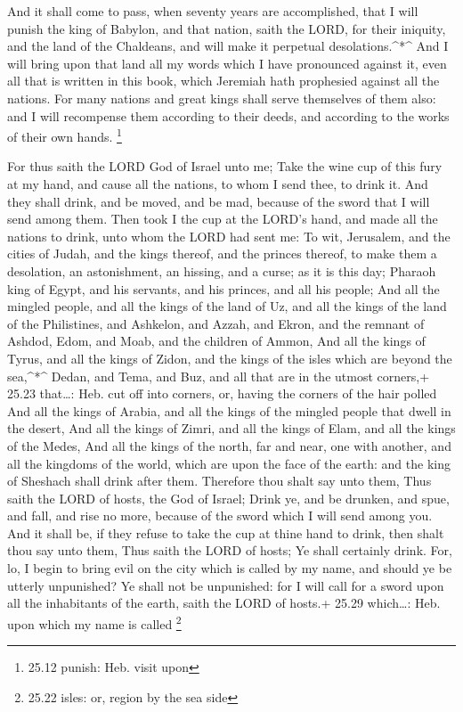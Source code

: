  And it shall come to pass, when seventy years are
accomplished, that I will punish the king of Babylon, and that nation,
saith the LORD, for their iniquity, and the land of the Chaldeans, and
will make it perpetual desolations.\^{}*\^{}  And I will
bring upon that land all my words which I have pronounced against it,
even all that is written in this book, which Jeremiah hath prophesied
against all the nations.  For many nations and great kings
shall serve themselves of them also: and I will recompense them
according to their deeds, and according to the works of their own hands.
\footnote{25.12 punish: Heb. visit upon}

 For thus saith the LORD God of Israel unto me; Take the
wine cup of this fury at my hand, and cause all the nations, to whom I
send thee, to drink it.  And they shall drink, and be
moved, and be mad, because of the sword that I will send among them.
 Then took I the cup at the LORD's hand, and made all the
nations to drink, unto whom the LORD had sent me:  To wit,
Jerusalem, and the cities of Judah, and the kings thereof, and the
princes thereof, to make them a desolation, an astonishment, an hissing,
and a curse; as it is this day;  Pharaoh king of Egypt, and
his servants, and his princes, and all his people;  And all
the mingled people, and all the kings of the land of Uz, and all the
kings of the land of the Philistines, and Ashkelon, and Azzah, and
Ekron, and the remnant of Ashdod,  Edom, and Moab, and the
children of Ammon,  And all the kings of Tyrus, and all the
kings of Zidon, and the kings of the isles which are beyond the
sea,\^{}*\^{}  Dedan, and Tema, and Buz, and all that are
in the utmost corners,+ 25.23 that\ldots: Heb. cut off into corners, or,
having the corners of the hair polled  And all the kings of
Arabia, and all the kings of the mingled people that dwell in the
desert,  And all the kings of Zimri, and all the kings of
Elam, and all the kings of the Medes,  And all the kings of
the north, far and near, one with another, and all the kingdoms of the
world, which are upon the face of the earth: and the king of Sheshach
shall drink after them.  Therefore thou shalt say unto
them, Thus saith the LORD of hosts, the God of Israel; Drink ye, and be
drunken, and spue, and fall, and rise no more, because of the sword
which I will send among you.  And it shall be, if they
refuse to take the cup at thine hand to drink, then shalt thou say unto
them, Thus saith the LORD of hosts; Ye shall certainly drink.
 For, lo, I begin to bring evil on the city which is called
by my name, and should ye be utterly unpunished? Ye shall not be
unpunished: for I will call for a sword upon all the inhabitants of the
earth, saith the LORD of hosts.+ 25.29 which\ldots: Heb. upon which my
name is called \footnote{25.22 isles: or, region by the sea side}

